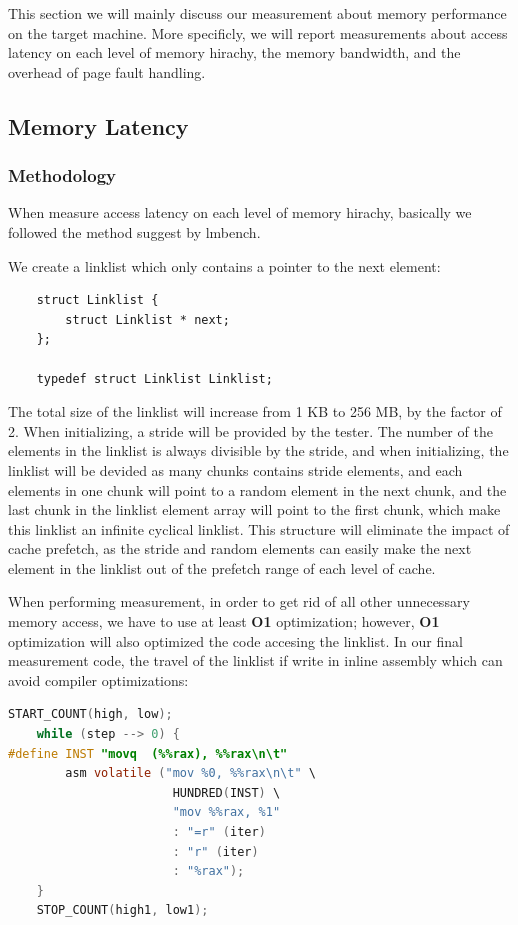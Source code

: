 
% 

This section we will mainly discuss our measurement about memory performance on the target machine. More specificly, we will report measurements about access latency on each level of memory hirachy, the memory bandwidth, and the overhead of page fault handling.

\subsection{Memory Latency}

\subsubsection{Methodology}

When measure access latency on each level of memory hirachy, basically we followed the method suggest by lmbench\cite{mcvoy1996lmbench}.

We create a linklist which only contains a pointer to the next element:

\begin{lstlisting}
    struct Linklist {
        struct Linklist * next;
    };

    typedef struct Linklist Linklist;
\end{lstlisting}

The total size of the linklist will increase from 1 KB to 256 MB, by the factor of 2. When initializing, a stride will be provided by the tester. The number of the elements in the linklist is always divisible by the stride, and when initializing, the linklist will be devided as many chunks contains stride elements, and each elements in one chunk will point to a random element in the next chunk, and the last chunk in the linklist element array will point to the first chunk, which make this linklist an infinite cyclical linklist. This structure will eliminate the impact of cache prefetch, as the stride and random elements can easily make the next element in the linklist out of the prefetch range of each level of cache.

When performing measurement, in order to get rid of all other unnecessary memory access, we have to use at least \textbf{O1} optimization; however, \textbf{O1} optimization will also optimized the code accesing the linklist. In our final measurement code, the travel of the linklist if write in inline assembly which can avoid compiler optimizations:

\begin{lstlisting}[language=C]
    START_COUNT(high, low);
    while (step --> 0) {
#define INST "movq	(%%rax), %%rax\n\t"
        asm volatile ("mov %0, %%rax\n\t" \
                       HUNDRED(INST) \
                       "mov %%rax, %1"
                       : "=r" (iter)
                       : "r" (iter)
                       : "%rax");
    }
    STOP_COUNT(high1, low1);
\end{lstlisting}

